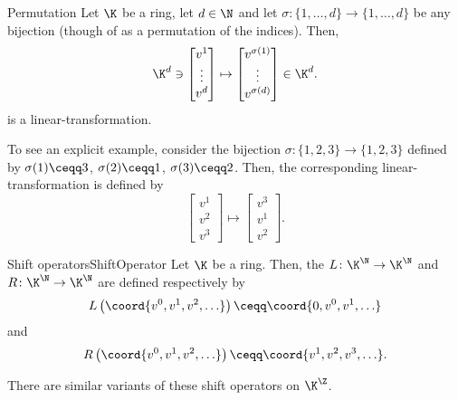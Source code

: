 \begin{exm}{Permutation}{}
	Let $\K$ be a ring, let $d\in \N$ and let $\sigma \colon \{ 1,\ldots ,d\} \rightarrow \{ 1,\ldots ,d\}$ be any bijection (though of as a permutation of the indices).  Then,
	\begin{equation}
		\K ^d\ni \begin{bmatrix}v^1 \\ \vdots \\ v^d\end{bmatrix}\mapsto \begin{bmatrix}v^{\sigma (1)} \\ \vdots \\ v^{\sigma (d)}\end{bmatrix}\in \K ^d.
	\end{equation}
	is a linear-transformation.
	
	To see an explicit example, consider the bijection $\sigma \colon \{ 1,2,3\} \rightarrow \{ 1,2,3\}$ defined by $\sigma (1)\ceqq 3$, $\sigma (2)\ceqq 1$, $\sigma (3)\ceqq 2$.  Then, the corresponding linear-transformation is defined by
	\begin{equation}
		\begin{bmatrix}v^1 \\ v^2 \\ v^3\end{bmatrix}\mapsto \begin{bmatrix}v^3 \\ v^1 \\ v^2\end{bmatrix}.
	\end{equation}
\end{exm}
\begin{exm}{Shift operators}{ShiftOperator}
	Let $\K$ be a ring.  Then, the  $L\colon \K ^{\N}\rightarrow \K ^{\N}$ and  $R\colon \K ^{\N}\rightarrow \K ^{\N}$ are defined respectively by
	\begin{equation}
		L\left( \coord{v^0,v^1,v^2,\ldots }\right) \ceqq \coord{0,v^0,v^1,\ldots} 
	\end{equation}
	and
	\begin{equation}
		R\left( \coord{v^0,v^1,v^2,\ldots }\right) \ceqq \coord{v^1,v^2,v^3,\ldots }.
	\end{equation}
	\begin{rmk}
		There are similar variants of these shift operators on $\K ^{\Z}$.
	\end{rmk}
\end{exm}
